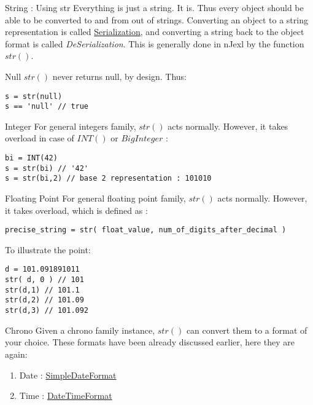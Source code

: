 \begin{section}{String : Using str}
Everything is just a string. It is. Thus every object should be able to be converted to and from out of strings.
Converting an object to a string representation is called \href{https://en.wikipedia.org/wiki/Serialization}{Serialization},
and converting a string back to the object format is called \emph{DeSerialization}.
This is generally done in nJexl by the function $str()$.

\begin{subsection}{Null}
$str()$ never returns null, by design. Thus:
\begin{lstlisting}[style=JexlStyle]
s = str(null)
s == 'null' // true  
\end{lstlisting}
\end{subsection}


\begin{subsection}{Integer}
For general integers family, $str()$ acts normally. However, it takes overload
in case of $INT()$ or $BigInteger$ :
\begin{lstlisting}[style=JexlStyle]
bi = INT(42)
s = str(bi) // '42'
s = str(bi,2) // base 2 representation : 101010
\end{lstlisting}
\end{subsection}

\begin{subsection}{Floating Point}
For general floating point family, $str()$ acts normally. 
However, it takes overload, which is defined as :

\begin{lstlisting}[style=JexlStyle]
precise_string = str( float_value, num_of_digits_after_decimal )
\end{lstlisting}

To illustrate the point:

\begin{lstlisting}[style=JexlStyle]
d = 101.091891011
str( d, 0 ) // 101 
str(d,1) // 101.1  
str(d,2) // 101.09 
str(d,3) // 101.092 
\end{lstlisting}

\end{subsection}

\begin{subsection}{Chrono}
Given a chrono family instance, $str()$ can convert them to a format of your choice.
These formats have been already discussed earlier, here they are again:
\begin{enumerate}
\item{Date : \href{https://docs.oracle.com/javase/8/docs/api/java/text/SimpleDateFormat.html}{SimpleDateFormat} }
\item{Time : \href{http://www.joda.org/joda-time/apidocs/org/joda/time/format/DateTimeFormat.html}{DateTimeFormat} }
\end{enumerate}


\end{subsection}
\end{section}
